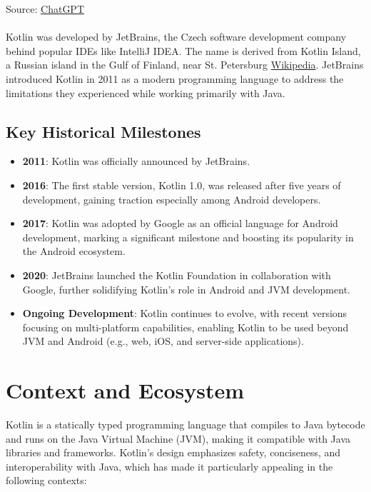 Source: \href{https://chatgpt.com/share/672e6c5a-aa64-8007-93e5-aefa60cbe9fc}{ChatGPT}
\\
\\
Kotlin was developed by JetBrains, the Czech software development company behind popular IDEs like IntelliJ IDEA. The name is derived from Kotlin Island, a Russian island in the Gulf of Finland, near St. Petersburg 
\href{https://en.wikipedia.org/wiki/Kotlin_(programming_language)}{Wikipedia}. JetBrains introduced Kotlin in 2011 as a modern programming language to address the limitations they experienced while working primarily with Java.

\subsection{Key Historical Milestones}
\begin{itemize}
    \item \textbf{2011}: Kotlin was officially announced by JetBrains.
    \item \textbf{2016}: The first stable version, Kotlin 1.0, was released after five years of development, gaining traction especially among Android developers.
    \item \textbf{2017}: Kotlin was adopted by Google as an official language for Android development, marking a significant milestone and boosting its popularity in the Android ecosystem.
    \item \textbf{2020}: JetBrains launched the Kotlin Foundation in collaboration with Google, further solidifying Kotlin's role in Android and JVM development.
    \item \textbf{Ongoing Development}: Kotlin continues to evolve, with recent versions focusing on multi-platform capabilities, enabling Kotlin to be used beyond JVM and Android (e.g., web, iOS, and server-side applications).
\end{itemize}

\section{Context and Ecosystem}

Kotlin is a statically typed programming language that compiles to Java bytecode and runs on the Java Virtual Machine (JVM), making it compatible with Java libraries and frameworks. Kotlin’s design emphasizes safety, conciseness, and interoperability with Java, which has made it particularly appealing in the following contexts:

